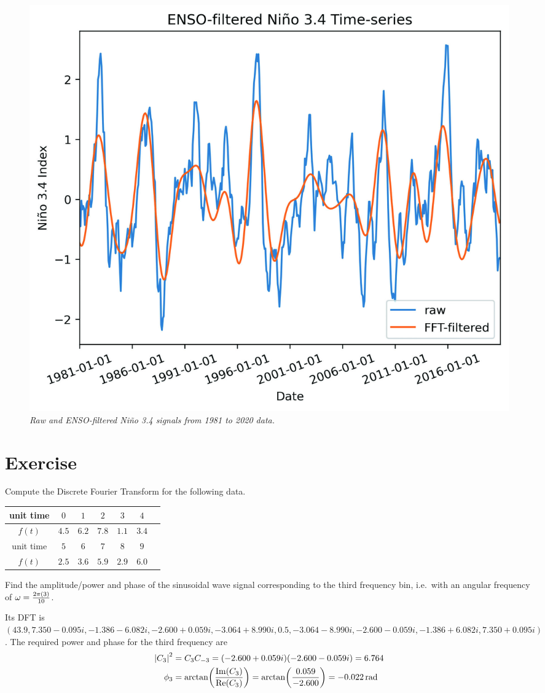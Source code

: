 \begin{figure}[ht!]
    \centering
    \includegraphics[scale=0.75]{graphics/NinoENSOFilter.jpg}
    \caption{\textit{Raw and ENSO-filtered Niño 3.4 signals from 1981 to 2020 data.}}
    \label{fig:nino2}
\end{figure}

\section{Exercise}
\begin{Exercise}
Compute the Discrete Fourier Transform for the following data.
\begin{center}
\begin{tabular}{|c|c|c|c|c|c|c|}
\hline
unit time & $0$ & $1$ & $2$ & $3$ & $4$ \\
\hline
$f(t)$ & $4.5$ & $6.2$ & $7.8$ & $1.1$ & $3.4$  \\
\hline
unit time & $5$ & $6$ & $7$ & $8$ & $9$ \\
\hline
$f(t)$ & $2.5$ & $3.6$ & $5.9$ & $2.9$ & $6.0$ \\
\hline
\end{tabular}
\end{center}
Find the amplitude/power and phase of the sinusoidal wave signal corresponding to the third frequency bin, i.e.\ with an angular frequency of $\omega = \smash{\frac{2\pi(3)}{10}}$. 
\end{Exercise}
\begin{Answer}
Its DFT is $(43.9, 7.350-0.095i, -1.386-6.082i, -2.600+0.059i, -3.064+8.990i, 0.5,  -3.064-8.990i, -2.600-0.059i, -1.386+6.082i, \allowbreak 7.350+0.095i)$. The required power and phase for the third frequency are 
\begin{align*}
\abs{C_3}^2 &= C_3C_{-3} = (-2.600+0.059i)(-2.600-0.059i) = 6.764 \\
\phi_3 &= \arctan(\frac{\Im(C_3)}{\Re(C_3)}) = \arctan(\frac{0.059}{-2.600}) = \SI{-0.022}{\radian}
\end{align*}
\end{Answer}

